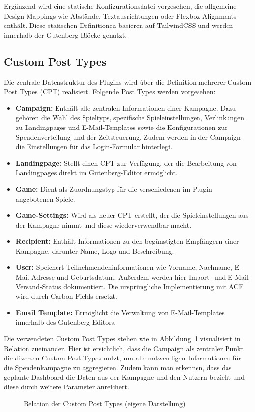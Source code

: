 Ergänzend wird eine statische Konfigurationsdatei vorgesehen, die allgemeine Design-Mappings wie Abstände, Textausrichtungen oder Flexbox-Alignments enthält.
Diese statischen Definitionen basieren auf TailwindCSS und werden innerhalb der Gutenberg-Blöcke genutzt.
\newpage
\subsection{Custom Post Types}
Die zentrale Datenstruktur des Plugins wird über die Definition mehrerer Custom Post Types (\gls{CPT}) realisiert.
Folgende Post Types werden vorgesehen:

\begin{itemize}
    \item \textbf{Campaign:} Enthält alle zentralen Informationen einer Kampagne.
    Dazu gehören die Wahl des Spieltyps, spezifische Spieleinstellungen, Verlinkungen zu Landingpages und E-Mail-Templates sowie die Konfigurationen zur Spendenverteilung und der Zeitsteuerung.
    Zudem werden in der Campaign die Einstellungen für das Login-Formular hinterlegt.

    \item \textbf{Landingpage:} Stellt einen CPT zur Verfügung, der die Bearbeitung von Landingpages direkt im Gutenberg-Editor ermöglicht.
    \item \textbf{Game:} Dient als Zuordnungstyp für die verschiedenen im Plugin angebotenen Spiele.
    \item \textbf{Game-Settings:} Wird als neuer CPT erstellt, der die Spieleinstellungen aus der Kampagne nimmt und diese wiederverwendbar macht.
    \item \textbf{Recipient:} Enthält Informationen zu den begünstigten Empfängern einer Kampagne, darunter Name, Logo und Beschreibung.
    \item \textbf{User:} Speichert Teilnehmendeninformationen wie Vorname, Nachname, E-Mail-Adresse und Geburtsdatum.
    Außerdem werden hier Import- und E-Mail-Versand-Status dokumentiert.
    Die ursprüngliche Implementierung mit ACF wird durch Carbon Fields ersetzt.
    \item \textbf{Email Template:} Ermöglicht die Verwaltung von E-Mail-Templates innerhalb des Gutenberg-Editors.
\end{itemize}

Die verwendeten Custom Post Types stehen wie in Abbildung~\ref{fig:datenmodell} visualisiert in Relation zueinander.
Hier ist ersichtlich, dass die Campaign als zentraler Punkt die diversen Custom Post Types nutzt, um alle notwendigen Informationen für die Spendenkampagne zu aggregieren.
Zudem kann man erkennen, dass das geplante Dashboard die Daten aus der Kampagne und den Nutzern bezieht und diese durch weitere Parameter anreichert.
\begin{figure}[H]
    \centering
    
    \caption{Relation der Custom Post Types (eigene Darstellung)}
    \label{fig:datenmodell}
\end{figure}


